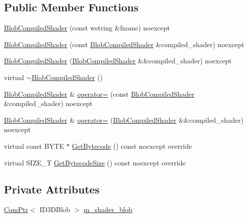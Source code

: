 \subsection*{Public Member Functions}
\begin{DoxyCompactItemize}
\item 
\hyperlink{classmage_1_1rendering_1_1_blob_compiled_shader_a9e29ef4b735ae26f6902077d9e7c4f1d}{Blob\+Compiled\+Shader} (const wstring \&fname) noexcept
\item 
\hyperlink{classmage_1_1rendering_1_1_blob_compiled_shader_a7b63a87261abf6059c957af4061af201}{Blob\+Compiled\+Shader} (const \hyperlink{classmage_1_1rendering_1_1_blob_compiled_shader}{Blob\+Compiled\+Shader} \&compiled\+\_\+shader) noexcept
\item 
\hyperlink{classmage_1_1rendering_1_1_blob_compiled_shader_afa58cbbad81febc6c2470f6f1b0de2ce}{Blob\+Compiled\+Shader} (\hyperlink{classmage_1_1rendering_1_1_blob_compiled_shader}{Blob\+Compiled\+Shader} \&\&compiled\+\_\+shader) noexcept
\item 
virtual \hyperlink{classmage_1_1rendering_1_1_blob_compiled_shader_ac983a2506dfe81e8e8ceb2b9ffa420d6}{$\sim$\+Blob\+Compiled\+Shader} ()
\item 
\hyperlink{classmage_1_1rendering_1_1_blob_compiled_shader}{Blob\+Compiled\+Shader} \& \hyperlink{classmage_1_1rendering_1_1_blob_compiled_shader_a07f7bf56354508ad499133b821e2fdc5}{operator=} (const \hyperlink{classmage_1_1rendering_1_1_blob_compiled_shader}{Blob\+Compiled\+Shader} \&compiled\+\_\+shader) noexcept
\item 
\hyperlink{classmage_1_1rendering_1_1_blob_compiled_shader}{Blob\+Compiled\+Shader} \& \hyperlink{classmage_1_1rendering_1_1_blob_compiled_shader_a14954683e57897937b0e0178b5a726a4}{operator=} (\hyperlink{classmage_1_1rendering_1_1_blob_compiled_shader}{Blob\+Compiled\+Shader} \&\&compiled\+\_\+shader) noexcept
\item 
virtual const B\+Y\+TE $\ast$ \hyperlink{classmage_1_1rendering_1_1_blob_compiled_shader_a4d7f3d2d9864cb12939386ff031bd783}{Get\+Bytecode} () const noexcept override
\item 
virtual S\+I\+Z\+E\+\_\+T \hyperlink{classmage_1_1rendering_1_1_blob_compiled_shader_ac3c3edb09ba96367f8c5d6741ec03041}{Get\+Bytecode\+Size} () const noexcept override
\end{DoxyCompactItemize}
\subsection*{Private Attributes}
\begin{DoxyCompactItemize}
\item 
\hyperlink{namespacemage_ae74f374780900893caa5555d1031fd79}{Com\+Ptr}$<$ I\+D3\+D\+Blob $>$ \hyperlink{classmage_1_1rendering_1_1_blob_compiled_shader_ad28d77dc5fd97d127c2e2dc875384449}{m\+\_\+shader\+\_\+blob}
\end{DoxyCompactItemize}
